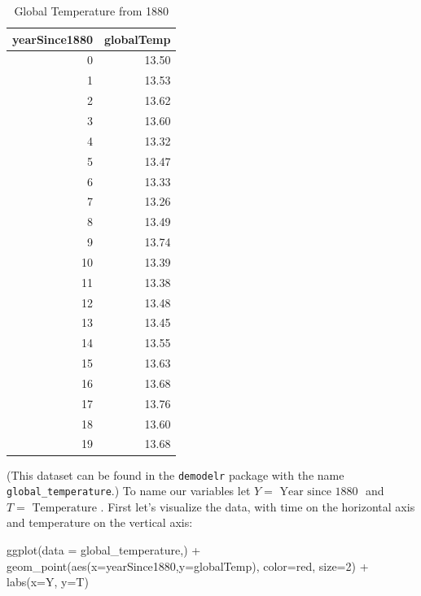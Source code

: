 \documentclass[
]{book}
\newenvironment{Shaded}{\begin{snugshade}}{\end{snugshade}}
\newcommand{\AttributeTok}[1]{\textcolor[rgb]{0.77,0.63,0.00}{#1}}
\newcommand{\DecValTok}[1]{\textcolor[rgb]{0.00,0.00,0.81}{#1}}
\newcommand{\FunctionTok}[1]{\textcolor[rgb]{0.00,0.00,0.00}{#1}}
\newcommand{\NormalTok}[1]{#1}
\newcommand{\SpecialCharTok}[1]{\textcolor[rgb]{0.00,0.00,0.00}{#1}}
\newcommand{\StringTok}[1]{\textcolor[rgb]{0.31,0.60,0.02}{#1}}
\theoremstyle{definition}
\theoremstyle{definition}
\theoremstyle{definition}
\theoremstyle{remark}
\begin{document}
\begin{table}

\caption{\label{tab:unnamed-chunk-132}Global Temperature from 1880}
\centering
\begin{tabular}[t]{r|r}
\hline
yearSince1880 & globalTemp\\
\hline
0 & 13.50\\
\hline
1 & 13.53\\
\hline
2 & 13.62\\
\hline
3 & 13.60\\
\hline
4 & 13.32\\
\hline
5 & 13.47\\
\hline
6 & 13.33\\
\hline
7 & 13.26\\
\hline
8 & 13.49\\
\hline
9 & 13.74\\
\hline
10 & 13.39\\
\hline
11 & 13.38\\
\hline
12 & 13.48\\
\hline
13 & 13.45\\
\hline
14 & 13.55\\
\hline
15 & 13.63\\
\hline
16 & 13.68\\
\hline
17 & 13.76\\
\hline
18 & 13.60\\
\hline
19 & 13.68\\
\hline
\end{tabular}
\end{table}

(This dataset can be found in the \texttt{demodelr} package with the name \texttt{global\_temperature}.) To name our variables let \(Y=\mbox{ Year since 1880 }\) and \(T= \mbox{ Temperature }\). First let's visualize the data, with time on the horizontal axis and temperature on the vertical axis:

\begin{Shaded}
\begin{Highlighting}[]
\FunctionTok{ggplot}\NormalTok{(}\AttributeTok{data =}\NormalTok{ global\_temperature,) }\SpecialCharTok{+}
  \FunctionTok{geom\_point}\NormalTok{(}\FunctionTok{aes}\NormalTok{(}\AttributeTok{x=}\NormalTok{yearSince1880,}\AttributeTok{y=}\NormalTok{globalTemp),}
             \AttributeTok{color=}\StringTok{\textquotesingle{}red\textquotesingle{}}\NormalTok{,}
             \AttributeTok{size=}\DecValTok{2}\NormalTok{) }\SpecialCharTok{+} 
  \FunctionTok{labs}\NormalTok{(}\AttributeTok{x=}\StringTok{\textquotesingle{}Y\textquotesingle{}}\NormalTok{, }\AttributeTok{y=}\StringTok{\textquotesingle{}T\textquotesingle{}}\NormalTok{)}
\end{Highlighting}
\end{Shaded}
\end{document}
